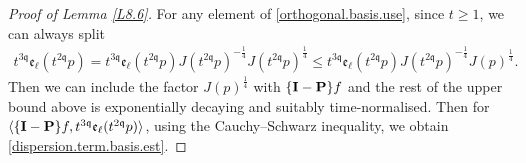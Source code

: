 \documentclass[reqno]{amsart}
\newcommand{\pv}{p}
\newcommand{\qq}{\mathfrak{q}}
\newcommand{\tqq}{t^{2\qq}}
\newcommand{\tTq}{t^{3\qq}}
\newcommand{\micro}{{\bf \{I- P\}}}
\theoremstyle{definition}
\numberwithin{equation}{section}
\numberwithin{theorem}{section}
\begin{document}
\begin{proof}[Proof of Lemma \ref{L8.6}]	
  For any element of \eqref{orthogonal.basis.use}, since $t \ge 1$, we can always split 
\begin{align}\label{basis.vector.split.bdd}
    \tTq \mathfrak{e}_{\ell}(\tqq \pv)
    =  \tTq\mathfrak{e}_{\ell}(\tqq \pv) J(\tqq \pv)^{-\frac{1}{4}} J(\tqq \pv)^{\frac{1}{4}}
    \leq 
    \tTq \mathfrak{e}_{\ell}(\tqq \pv) J(\tqq \pv)^{-\frac{1}{4}} J( \pv)^{\frac{1}{4}}.
\end{align}
Then we can include the factor $J( \pv)^{\frac{1}{4}}$ with $\micro f$ and the rest of the upper bound above is exponentially decaying and suitably time-normalised.  Then for $\langle \micro  f, \tTq \mathfrak{e}_{\ell}(\tqq \pv)\rangle$, using the Cauchy--Schwarz inequality, we obtain   \eqref{dispersion.term.basis.est}.  



\end{proof}
\end{document}
